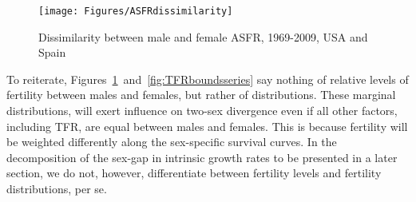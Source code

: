 \begin{figure}[ht!]
        \centering  
          \caption{Dissimilarity between male and female ASFR, 1969-2009, USA
          and Spain}
           \texttt{[image: Figures/ASFRdissimilarity]}
          \label{fig:ASFRdissimilarity}
\end{figure}

To reiterate, Figures~\ref{fig:ASFRdissimilarity}~and~\ref{fig:TFRboundsseries}
say nothing of relative levels of fertility between males and females, but
rather of distributions. These marginal distributions, will exert influence on
two-sex divergence even if all other factors, including TFR, are equal between
males and females. This is because fertility will be weighted differently along
the sex-specific survival curves. In the decomposition of the sex-gap in
intrinsic growth rates to be presented in a later section, we do not, however,
differentiate between fertility levels and fertility distributions, per se. 

 \FloatBarrier